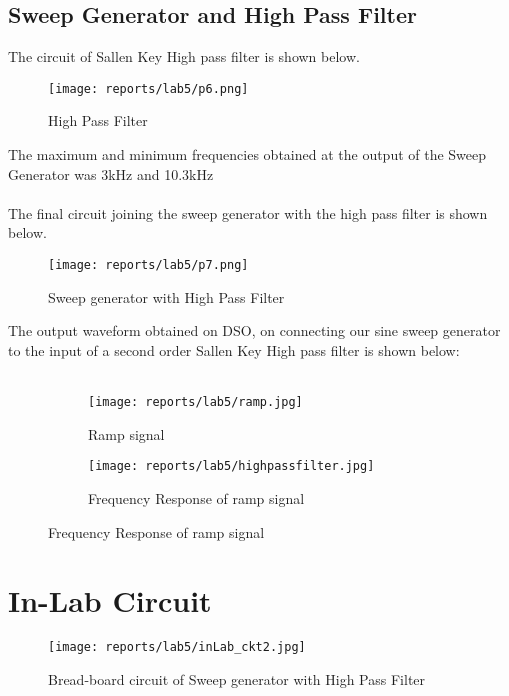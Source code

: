 \documentclass[12pt]{article}
\begin{document}

    \subsection{Sweep Generator and High Pass Filter}
        The circuit of Sallen Key High pass filter is shown below.
        \begin{figure}[H]
            \centering
            \texttt{[image: reports/lab5/p6.png]}
            \caption{High Pass Filter}
        \end{figure}
        \noindent
        The maximum and minimum frequencies obtained at the output of the Sweep Generator was 3kHz and 10.3kHz
        \\\\
        The final circuit joining the sweep generator with the high pass filter is shown below.
        \begin{figure}[H]
            \centering
            \texttt{[image: reports/lab5/p7.png]}
            \caption{Sweep generator with High Pass Filter}
        \end{figure}
        \noindent
        The output waveform obtained on DSO, on connecting our sine sweep generator to the input of a second order Sallen Key High pass filter is shown below:\\\\
        \begin{figure}[H]
            \centering
            \begin{subfigure}{.5\textwidth}
                \centering
                \texttt{[image: reports/lab5/ramp.jpg]}
                \caption{Ramp signal}
            \end{subfigure}%
            \begin{subfigure}{.5\textwidth}
                \centering
                \texttt{[image: reports/lab5/highpassfilter.jpg]}
                \caption{Frequency Response of ramp signal}
            \end{subfigure}%
        \end{figure}
    \newpage
\section{In-Lab Circuit}
    \begin{figure}[H]
        \centering
        \texttt{[image: reports/lab5/inLab\_ckt2.jpg]}
        \caption{Bread-board circuit of Sweep generator with High Pass Filter}
    \end{figure}
    
\end{document}
